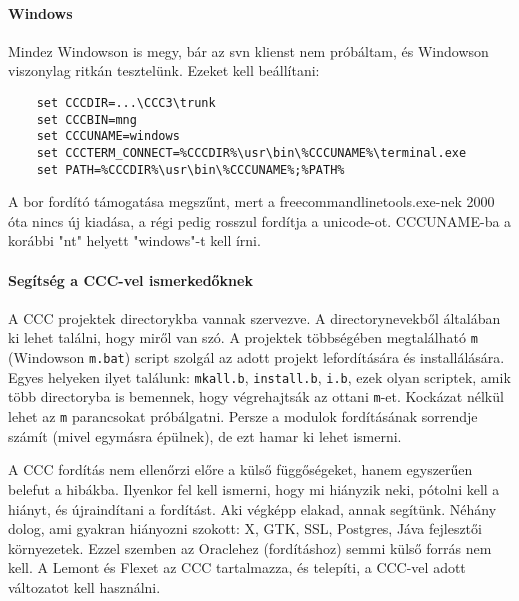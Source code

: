 \paragraph{Windows}

Mindez Windowson is megy, bár az svn klienst nem próbáltam,
és Windowson viszonylag ritkán tesztelünk. Ezeket kell beállítani:
\begin{verbatim}
    set CCCDIR=...\CCC3\trunk
    set CCCBIN=mng
    set CCCUNAME=windows
    set CCCTERM_CONNECT=%CCCDIR%\usr\bin\%CCCUNAME%\terminal.exe
    set PATH=%CCCDIR%\usr\bin\%CCCUNAME%;%PATH%
\end{verbatim}
A bor fordító támogatása megszűnt, 
mert a freecommandlinetools.exe-nek 2000 óta nincs új kiadása, 
a régi pedig rosszul fordítja a unicode-ot. 
CCCUNAME-ba a korábbi "nt" helyett "windows"-t kell írni.


\paragraph{Segítség a CCC-vel ismerkedőknek}

A CCC projektek directorykba vannak
szervezve. A directorynevekből általában ki lehet találni,
hogy miről van szó. A projektek többségében megtalálható \verb!m!
(Windowson \verb!m.bat!) script szolgál az adott projekt
lefordítására és installálására. Egyes helyeken ilyet találunk: 
\verb!mkall.b!, \verb!install.b!, \verb!i.b!, 
ezek olyan   scriptek, amik több directoryba is bemennek, 
hogy végrehajtsák   az ottani \verb!m!-et. Kockázat nélkül 
lehet az \verb!m! parancsokat próbálgatni. Persze a modulok 
fordításának  sorrendje számít (mivel egymásra épülnek),
de ezt hamar ki lehet ismerni.
  
A CCC fordítás nem ellenőrzi előre a külső függőségeket,
hanem egyszerűen belefut a hibákba. Ilyenkor fel kell ismerni,
hogy mi hiányzik neki, pótolni kell a hiányt, és újraindítani
a fordítást. Aki végképp elakad, annak segítünk. 
Néhány dolog, ami gyakran hiányozni szokott: 
X, GTK, SSL, Postgres, Jáva fejlesztői környezetek.
Ezzel szemben az Oraclehez (fordításhoz) semmi külső forrás nem kell.
A Lemont és Flexet az CCC tartalmazza, és telepíti,
a CCC-vel adott változatot kell használni.

 